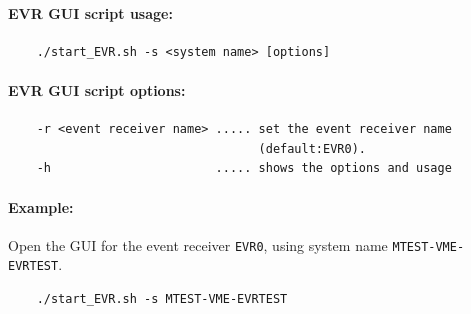 \documentclass[12pt,a4paper]{article}
\begin{document}
\paragraph{EVR GUI script usage:}
\begin{verbatim}
	./start_EVR.sh -s <system name> [options]
\end{verbatim}


\paragraph{EVR GUI script options:}
\begin{verbatim}
	-r <event receiver name> ..... set the event receiver name
	                               (default:EVR0).
	-h                       ..... shows the options and usage
\end{verbatim}


\paragraph{Example:} Open the GUI for the event receiver \texttt{EVR0}, \newline using system name \texttt{MTEST-VME-EVRTEST}.
\begin{verbatim}
	./start_EVR.sh -s MTEST-VME-EVRTEST
\end{verbatim}




\end{document}
